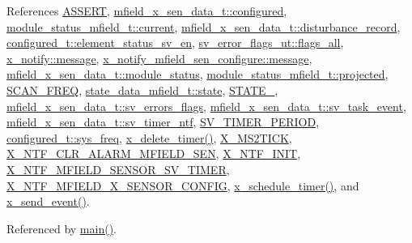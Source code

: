 References \hyperlink{a00072_source_l00059}{A\+S\+S\+E\+R\+T}, \hyperlink{a00025_source_l00036}{mfield\+\_\+x\+\_\+sen\+\_\+data\+\_\+t\+::configured}, \hyperlink{a00019_source_l00108}{module\+\_\+status\+\_\+mfield\+\_\+t\+::current}, \hyperlink{a00025_source_l00041}{mfield\+\_\+x\+\_\+sen\+\_\+data\+\_\+t\+::disturbance\+\_\+record}, \hyperlink{a00021_source_l00205}{configured\+\_\+t\+::element\+\_\+status\+\_\+sv\+\_\+en}, \hyperlink{a00022_source_l00044}{sv\+\_\+error\+\_\+flags\+\_\+ut\+::flags\+\_\+all}, \hyperlink{a00036_source_l00075}{x\+\_\+notify\+::message}, \hyperlink{a00019_ae926905663cb8ca01f1bc2d670e428f5}{x\+\_\+notify\+\_\+mfield\+\_\+sen\+\_\+configure\+::message}, \hyperlink{a00025_source_l00045}{mfield\+\_\+x\+\_\+sen\+\_\+data\+\_\+t\+::module\+\_\+status}, \hyperlink{a00019_af2267fb093fb5dcaa006a570a6da3b6b}{module\+\_\+status\+\_\+mfield\+\_\+t\+::projected}, \hyperlink{a00021_source_l00096}{S\+C\+A\+N\+\_\+\+F\+R\+E\+Q}, \hyperlink{a00019_source_l00103}{state\+\_\+data\+\_\+mfield\+\_\+t\+::state}, \hyperlink{a00021_source_l00149}{S\+T\+A\+T\+E\+\_}, \hyperlink{a00025_source_l00051}{mfield\+\_\+x\+\_\+sen\+\_\+data\+\_\+t\+::sv\+\_\+errors\+\_\+flags}, \hyperlink{a00025_source_l00029}{mfield\+\_\+x\+\_\+sen\+\_\+data\+\_\+t\+::sv\+\_\+task\+\_\+event}, \hyperlink{a00025_source_l00032}{mfield\+\_\+x\+\_\+sen\+\_\+data\+\_\+t\+::sv\+\_\+timer\+\_\+ntf}, \hyperlink{a00023_source_l00020}{S\+V\+\_\+\+T\+I\+M\+E\+R\+\_\+\+P\+E\+R\+I\+O\+D}, \hyperlink{a00021_source_l00192}{configured\+\_\+t\+::sys\+\_\+freq}, \hyperlink{a00037_source_l00482}{x\+\_\+delete\+\_\+timer()}, \hyperlink{a00036_source_l00048}{X\+\_\+\+M\+S2\+T\+I\+C\+K}, \hyperlink{a00021_source_l00177}{X\+\_\+\+N\+T\+F\+\_\+\+C\+L\+R\+\_\+\+A\+L\+A\+R\+M\+\_\+\+M\+F\+I\+E\+L\+D\+\_\+\+S\+E\+N}, \hyperlink{a00036_source_l00030}{X\+\_\+\+N\+T\+F\+\_\+\+I\+N\+I\+T}, \hyperlink{a00025_source_l00015}{X\+\_\+\+N\+T\+F\+\_\+\+M\+F\+I\+E\+L\+D\+\_\+\+S\+E\+N\+S\+O\+R\+\_\+\+S\+V\+\_\+\+T\+I\+M\+E\+R}, \hyperlink{a00019_source_l00011}{X\+\_\+\+N\+T\+F\+\_\+\+M\+F\+I\+E\+L\+D\+\_\+\+X\+\_\+\+S\+E\+N\+S\+O\+R\+\_\+\+C\+O\+N\+F\+I\+G}, \hyperlink{a00037_source_l00456}{x\+\_\+schedule\+\_\+timer()}, and \hyperlink{a00037_source_l00381}{x\+\_\+send\+\_\+event()}.



Referenced by \hyperlink{a00048_source_l00080}{main()}.


